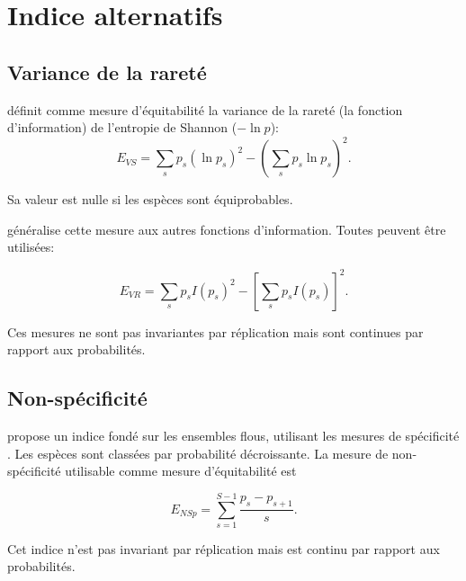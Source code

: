 \documentclass[
  11pt,
  french,
  a4paper,
  extrafontsizes,onecolumn,openright
  ]{memoir}
\begin{document}
\hypertarget{indice-alternatifs}{%
\section{Indice alternatifs}\label{indice-alternatifs}}

\hypertarget{variance-de-la-raretuxe9}{%
\subsection{Variance de la rareté}\label{variance-de-la-raretuxe9}}

\textcite{Engen1977} définit comme mesure d'équitabilité la variance de la rareté (la fonction d'information) de l'entropie de Shannon (\(-\ln p\)):
\begin{equation}
  \label{eq:Engen1977}
  E_\mathit{VS} = \sum_{s}{p_s(\ln p_s)^2}-(\sum_s{p_s \ln p_s})^2.
\end{equation}

Sa valeur est nulle si les espèces sont équiprobables.

\textcite{Ricotta2003b} généralise cette mesure aux autres fonctions d'information.
Toutes peuvent être utilisées:

\begin{equation}
  \label{eq:Ricotta2003b}
  E_\mathit{VR} = \sum_{s}{p_s I(p_s)^2}-[\sum_s{p_s I(p_s)}]^2.
\end{equation}

Ces mesures ne sont pas invariantes par réplication mais sont continues par rapport aux probabilités.

\hypertarget{non-spuxe9cificituxe9}{%
\subsection{Non-spécificité}\label{non-spuxe9cificituxe9}}

\textcite{Ricotta2004} propose un indice fondé sur les ensembles flous, utilisant les mesures de spécificité \autocite{Yager1992}.
Les espèces sont classées par probabilité décroissante. La mesure de non-spécificité utilisable comme mesure d'équitabilité est

\begin{equation}
  \label{eq:Ricotta2004}
  E_\mathit{NSp} = \sum_{s=1}^{S-1}{\frac{p_s-p_{s+1}}{s}}.
\end{equation}

Cet indice n'est pas invariant par réplication mais est continu par rapport aux probabilités.
\end{document}
